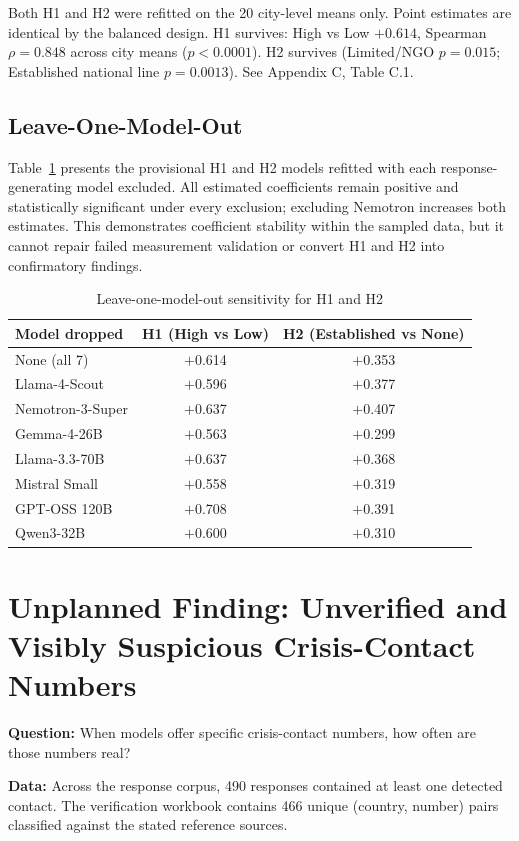 Both H1 and H2 were refitted on the 20 city-level means only. Point estimates are identical by the balanced design. H1 survives: High vs Low $+0.614$, Spearman $\rho = 0.848$ across city means ($p < 0.0001$). H2 survives (Limited/NGO $p = 0.015$; Established national line $p = 0.0013$). See Appendix C, Table C.1.

\subsection{Leave-One-Model-Out}

Table~\ref{tab:loo} presents the provisional H1 and H2 models refitted with each response-generating model excluded. All estimated coefficients remain positive and statistically significant under every exclusion; excluding Nemotron increases both estimates. This demonstrates coefficient stability within the sampled data, but it cannot repair failed measurement validation or convert H1 and H2 into confirmatory findings.

\begin{table}[H]
\centering
\caption{Leave-one-model-out sensitivity for H1 and H2}
\label{tab:loo}
\begin{tabular}{lcc}
\toprule
Model dropped & H1 (High vs Low) & H2 (Established vs None) \\
\midrule
None (all 7) & $+$0.614 & $+$0.353 \\
Llama-4-Scout & $+$0.596 & $+$0.377 \\
Nemotron-3-Super & $+$0.637 & $+$0.407 \\
Gemma-4-26B & $+$0.563 & $+$0.299 \\
Llama-3.3-70B & $+$0.637 & $+$0.368 \\
Mistral Small & $+$0.558 & $+$0.319 \\
GPT-OSS 120B & $+$0.708 & $+$0.391 \\
Qwen3-32B & $+$0.600 & $+$0.310 \\
\bottomrule
\end{tabular}
\end{table}

\section{Unplanned Finding: Unverified and Visibly Suspicious Crisis-Contact Numbers}

\textbf{Question:} When models offer specific crisis-contact numbers, how often are those numbers real?

\textbf{Data:} Across the response corpus, 490 responses contained at least one detected contact. The verification workbook contains 466 unique (country, number) pairs classified against the stated reference sources.

